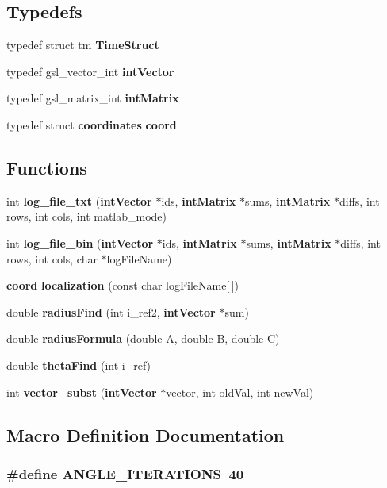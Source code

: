 \subsection*{Typedefs}
\begin{DoxyCompactItemize}
\item 
typedef struct tm {\bf Time\+Struct}
\item 
typedef gsl\+\_\+vector\+\_\+int {\bf int\+Vector}
\item 
typedef gsl\+\_\+matrix\+\_\+int {\bf int\+Matrix}
\item 
typedef struct {\bf coordinates} {\bf coord}
\end{DoxyCompactItemize}
\subsection*{Functions}
\begin{DoxyCompactItemize}
\item 
int {\bf log\+\_\+file\+\_\+txt} ({\bf int\+Vector} $\ast$ids, {\bf int\+Matrix} $\ast$sums, {\bf int\+Matrix} $\ast$diffs, int rows, int cols, int matlab\+\_\+mode)
\item 
int {\bf log\+\_\+file\+\_\+bin} ({\bf int\+Vector} $\ast$ids, {\bf int\+Matrix} $\ast$sums, {\bf int\+Matrix} $\ast$diffs, int rows, int cols, char $\ast$log\+File\+Name)
\item 
{\bf coord} {\bf localization} (const char log\+File\+Name[$\,$])
\item 
double {\bf radius\+Find} (int i\+\_\+ref2, {\bf int\+Vector} $\ast$sum)
\item 
double {\bf radius\+Formula} (double A, double B, double C)
\item 
double {\bf theta\+Find} (int i\+\_\+ref)
\item 
int {\bf vector\+\_\+subst} ({\bf int\+Vector} $\ast$vector, int old\+Val, int new\+Val)
\end{DoxyCompactItemize}


\subsection{Macro Definition Documentation}
\subsubsection[{A\+N\+G\+L\+E\+\_\+\+I\+T\+E\+R\+A\+T\+I\+O\+NS}]{\setlength{\rightskip}{0pt plus 5cm}\#define A\+N\+G\+L\+E\+\_\+\+I\+T\+E\+R\+A\+T\+I\+O\+NS~40}\label{RIDLib_8h_a1efdd759b0e0e31df94d9e6ef480ada3}
